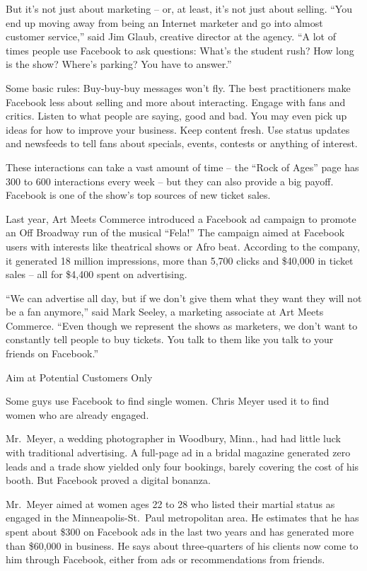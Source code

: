 ﻿\documentclass[12pt]{article}
\begin{document}
But it's not just about marketing -- or, at least, it's not just about selling. ``You end up moving
away from being an Internet marketer and go into almost customer service,'' said Jim Glaub, creative
director at the agency. ``A lot of times people use Facebook to ask questions: What's the student
rush? How long is the show? Where's parking? You have to answer.''

Some basic rules: Buy-buy-buy messages won't fly. The best practitioners make Facebook less about
selling and more about interacting. Engage with fans and critics. Listen to what people are saying,
good and bad. You may even pick up ideas for how to improve your business. Keep content fresh. Use
status updates and newsfeeds to tell fans about specials, events, contests or anything of interest.

These interactions can take a vast amount of time -- the ``Rock of Ages'' page has 300 to 600
interactions every week -- but they can also provide a big payoff. Facebook is one of the show's top
sources of new ticket sales.

Last year, Art Meets Commerce introduced a Facebook ad campaign to promote an Off Broadway run of
the musical ``Fela!'' The campaign aimed at Facebook users with interests like theatrical shows or
Afro beat. According to the company, it generated 18 million impressions, more than 5,700 clicks and
\$40,000 in ticket sales -- all for \$4,400 spent on advertising.

``We can advertise all day, but if we don't give them what they want they will not be a fan
anymore,'' said Mark Seeley, a marketing associate at Art Meets Commerce. ``Even though we represent
the shows as marketers, we don't want to constantly tell people to buy tickets. You talk to them
like you talk to your friends on Facebook.''

Aim at Potential Customers Only

Some guys use Facebook to find single women. Chris Meyer used it to find women who are already
engaged.

Mr.~Meyer, a wedding photographer in Woodbury, Minn., had had little luck with traditional
advertising. A full-page ad in a bridal magazine generated zero leads and a trade show yielded only
four bookings, barely covering the cost of his booth. But Facebook proved a digital bonanza.

Mr.~Meyer aimed at women ages 22 to 28 who listed their martial status as engaged in the
Minneapolis-St.~Paul metropolitan area. He estimates that he has spent about \$300 on Facebook ads
in the last two years and has generated more than \$60,000 in business. He says about three-quarters
of his clients now come to him through Facebook, either from ads or recommendations from friends.
\end{document}
